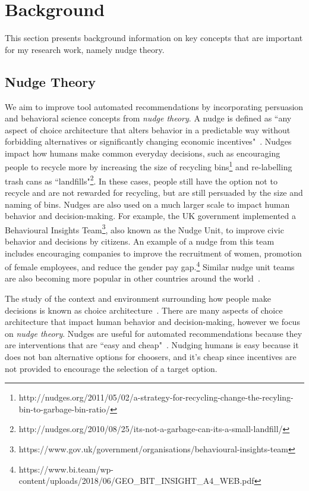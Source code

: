 \section{Background}

This section presents background information on key concepts that are important for my research work, namely nudge theory.

\subsection{Nudge Theory}

We aim to improve tool automated recommendations by incorporating persuasion and behavioral science concepts from \textit{nudge theory}. A nudge is defined as ``any aspect of choice architecture that alters behavior in a predictable way without forbidding alternatives or significantly changing economic incentives"~\cite[p.~6]{sunstein2008nudge}. Nudges impact how humans make common everyday decisions, such as encouraging people to recycle more by increasing the size of recycling bins\footnote{http://nudges.org/2011/05/02/a-strategy-for-recycling-change-the-recyling-bin-to-garbage-bin-ratio/} and re-labelling trash cans as ``landfills"\footnote{http://nudges.org/2010/08/25/its-not-a-garbage-can-its-a-small-landfill/}. In these cases, people still have the option not to recycle and are not rewarded for recycling, but are still persuaded by the size and naming of bins. Nudges are also used on a much larger scale to impact human behavior and decision-making. For example, the UK government implemented a Behavioural Insights Team\footnote{https://www.gov.uk/government/organisations/behavioural-insights-team}, also known as the Nudge Unit, to improve civic behavior and decisions by citizens. An example of a nudge from this team includes encouraging companies to improve the recruitment of women, promotion of female employees, and reduce the gender pay gap.\footnote{https://www.bi.team/wp-content/uploads/2018/06/GEO\_BIT\_INSIGHT\_A4\_WEB.pdf} Similar nudge unit teams are also becoming more popular in other countries around the world~\cite{DelBalzoNudging}.

The study of the context and environment surrounding how people make decisions is known as choice architecture~\cite{thaler2014choice}. There are many aspects of choice architecture that impact human behavior and decision-making, however we focus on \textit{nudge theory}. Nudges are useful for automated recommendations because they are interventions that are ``easy and cheap"~\cite[p.~6]{sunstein2008nudge}. Nudging humans is easy because it does not ban alternative options for choosers, and it's cheap since incentives are not provided to encourage the selection of a target option.  %

